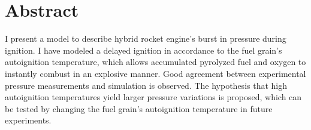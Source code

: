 \vspace{6cm}
\chapter*{Abstract}

I present a model to describe hybrid rocket engine's burst in pressure during ignition. I have modeled a delayed ignition in accordance to the fuel grain's autoignition temperature, which allows accumulated pyrolyzed fuel and oxygen to instantly combust in an explosive manner. Good agreement between experimental pressure measurements and simulation is observed. The hypothesis that high autoignition temperatures yield larger pressure variations is proposed, which can be tested by changing the fuel grain's autoignition temperature in future experiments.

